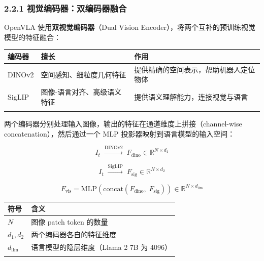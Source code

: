 \documentclass[
  chinese,
]{ctexart}
\begin{document}
\subsubsection{2.2.1
视觉编码器：双编码器融合}\label{ux89c6ux89c9ux7f16ux7801ux5668ux53ccux7f16ux7801ux5668ux878dux5408}

OpenVLA 使用\textbf{双视觉编码器}（Dual Vision
Encoder），将两个互补的预训练视觉模型的特征融合：

\begin{center}
\begin{tabular}{@{}>{\raggedright\arraybackslash}p{} >{\raggedright\arraybackslash}p{} >{\raggedright\arraybackslash}p{}@{}}
\toprule\noalign{}
编码器 & 擅长 & 作用 \\
\midrule\noalign{}
DINOv2 & 空间感知、细粒度几何特征 & 提供精确的空间表示，帮助机器人定位物体 \\
SigLIP & 图像-语言对齐、高级语义特征 & 提供语义理解能力，连接视觉与语言 \\
\bottomrule\noalign{}
\end{tabular}
\end{center}

两个编码器分别处理输入图像，输出的特征在通道维度上拼接（channel-wise
concatenation），然后通过一个 MLP 投影器映射到语言模型的输入空间：

\[
I_t \;\xrightarrow{\text{DINOv2}}\; F_{\text{dino}} \in \mathbb{R}^{N \times d_1}
\]

\[
I_t \;\xrightarrow{\text{SigLIP}}\; F_{\text{sig}} \in \mathbb{R}^{N \times d_2}
\]

\[
F_{\text{vis}} = \text{MLP}\!\left(\text{concat}(F_{\text{dino}},\; F_{\text{sig}})\right) \in \mathbb{R}^{N \times d_{\text{llm}}}
\]

\begin{center}
\begin{tabular}{@{}>{\raggedright\arraybackslash}p{} >{\raggedright\arraybackslash}p{}@{}}
\toprule\noalign{}
符号 & 含义 \\
\midrule\noalign{}
\(N\) & 图像 patch token 的数量 \\
\(d_1, d_2\) & 两个编码器各自的特征维度 \\
\(d_{\text{llm}}\) & 语言模型的隐层维度（Llama 2 7B 为 4096） \\
\bottomrule\noalign{}
\end{tabular}
\end{center}
\end{document}
